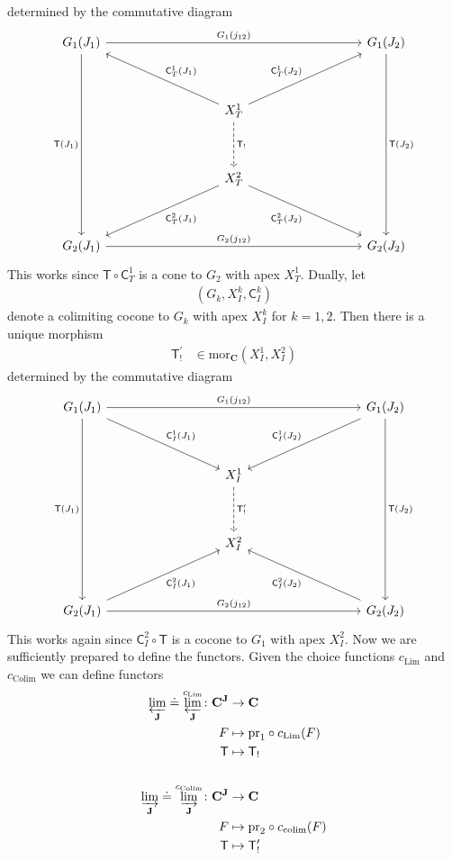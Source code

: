 determined by the commutative diagram
\[
\begin{tikzcd}[row sep=huge, column sep=9em]
  G_{1}(J_{1})
  \arrow{rr}{G_{1}(j_{12})}
  \arrow[swap]{ddd}{\mathsf{T}(J_{1})}
  &
  &
  G_{1}(J_{2})
  \arrow{ddd}{\mathsf{T}(J_{2})}
  \\
  &
  X_{T}^{1}
  \arrow{ur}{\mathsf{C}_{T}^{1}(J_{2})}
  \arrow[dashed]{d}{\mathsf{T}_{!}}
  \arrow[swap]{ul}{\mathsf{C}_{T}^{1}(J_{1})}
  &
  \\
  &
  X_{T}^{2}
  \arrow[swap]{dr}{\mathsf{C}_{T}^{2}(J_{2})}
  \arrow{dl}{\mathsf{C}_{T}^{2}(J_{1})}
  &
  \\
  G_{2}(J_{1})
  \arrow{rr}{G_{2}(j_{12})}
  &
  &
  G_{2}(J_{2})
\end{tikzcd}
\]
This works since $\mathsf{T} \circ \mathsf{C}_{T}^{1}$ is a cone to $G_{2}$ with apex $X_{T}^{1}$. Dually, let
\begin{align*}
  \left(
    G_{k},
    X_{I}^{k},
    \mathsf{C}_{I}^{k}
  \right)
\end{align*}
denote a colimiting cocone to $G_{k}$ with apex $X_{I}^{k}$ for $k = 1,2$. Then there is a unique morphism
\begin{align*}
  \mathsf{T}_{!}^{\prime}
  &\in
  \mathrm{mor}_{\mathbf{C}}
  \left(
    X_{I}^{1},
    X_{I}^{2}
  \right)
\end{align*}
determined by the commutative diagram
\[
\begin{tikzcd}[row sep=huge, column sep=9em]
  G_{1}(J_{1})
  \arrow{rr}{G_{1}(j_{12})}
  \arrow[swap]{ddd}{\mathsf{T}(J_{1})}
  \arrow{dr}{\mathsf{C}_{I}^{1}(J_{1})}
  &
  &
  G_{1}(J_{2})
  \arrow[swap]{dl}{\mathsf{C}_{I}^{1}(J_{2})}
  \arrow{ddd}{\mathsf{T}(J_{2})}
  \\
  &
  X_{I}^{1}
  \arrow[dashed]{d}{\mathsf{T}_{!}^{\prime}}
  &
  \\
  &
  X_{I}^{2}
  &
  \\
  G_{2}(J_{1})
  \arrow[swap]{ur}{\mathsf{C}_{I}^{2}(J_{1})}
  \arrow{rr}{G_{2}(j_{12})}
  &
  &
  G_{2}(J_{2})
  \arrow{ul}{\mathsf{C}_{I}^{2}(J_{2})}
\end{tikzcd}
\]
This works again since $\mathsf{C}_{I}^{2} \circ \mathsf{T}$ is a cocone to $G_{1}$ with apex $X_{I}^{2}$. Now we are sufficiently prepared to define the functors. Given the choice functions $c_{\mathrm{Lim}}$ and $c_{\mathrm{Colim}}$ we can define functors
\begin{align*}
  \varprojlim_{\mathbf{J}}
  \doteq
  \varprojlim_{\mathbf{J}}^{c_{\mathrm{Lim}}}
  \colon
  \mathbf{C}^{\mathbf{J}}
  &\rightarrow
  \mathbf{C}
  \\
  F
  &\mapsto
  \mathrm{pr}_{1}
  \circ
  c_{\mathrm{Lim}}(F)
  \\
  \mathsf{T}
  &\mapsto
  \mathsf{T}_{!}
  \\
  \\
  \varinjlim_{\mathbf{J}}
  \doteq
  \varinjlim_{\mathbf{J}}^{c_{\mathrm{Colim}}}
  \colon
  \mathbf{C}^{\mathbf{J}}
  &\rightarrow
  \mathbf{C}
  \\
  F
  &\mapsto
  \mathrm{pr}_{2}
  \circ
  c_{\mathrm{colim}}(F)
  \\
  \mathsf{T}
  &\mapsto
  \mathsf{T}_{!}^{\prime}
\end{align*}
